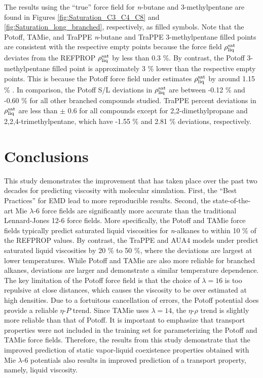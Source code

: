\documentclass[preprint,review,12pt]{elsarticle}
\begin{document}
	The results using the ``true'' force field for \textit{n}-butane and 3-methylpentane are found in Figures \ref{fig:Saturation_C3_C4_C8} and \ref{fig:Saturation_long_branched}, respectively, as filled symbols. Note that the Potoff, TAMie, and TraPPE \textit{n}-butane and TraPPE 3-methylpentane filled points are consistent with the respective empty points because the force field $\rho_{\rm liq}^{\rm sat}$ deviates from the REFPROP $\rho_{\rm liq}^{\rm sat}$ by less than 0.3 \%. By contrast, the Potoff 3-methylpentane filled point is approximately 3 \% lower than the respective empty points. This is because the Potoff force field under estimates $\rho_{\rm liq}^{\rm sat}$ by around 1.15 \% \cite{Potoff_branched}. In comparison, the Potoff S/L deviations in $\rho_{\rm liq}^{\rm sat}$ are between -0.12 \% and -0.60 \% for all other branched compounds studied. TraPPE percent deviations in $\rho_{\rm liq}^{\rm sat}$ are less than $\pm$ 0.6 for all compounds except for 2,2-dimethylpropane and 2,2,4-trimethylpentane, which have -1.55 \% and 2.81 \% deviations, respectively.     
	
	
	\section{Conclusions} \label{Conclusions}
	
	This study demonstrates the improvement that has taken place over the past two decades for predicting viscosity with molecular simulation. First, the ``Best Practices'' for EMD lead to more reproducible results. Second, the state-of-the-art Mie $\lambda$-6 force fields are significantly more accurate than the traditional Lennard-Jones 12-6 force fields. More specifically, the Potoff and TAMie force fields typically predict saturated liquid viscosities for \textit{n}-alkanes to within 10 \% of the REFPROP values. By contrast, the TraPPE and AUA4 models under predict saturated liquid viscosities by 20 \% to 50 \%, where the deviations are largest at lower temperatures. While Potoff and TAMie are also more reliable for branched alkanes, deviations are larger and demonstrate a similar temperature dependence. The key limitation of the Potoff force field is that the choice of $\lambda = 16$ is too repulsive at close distances, which causes the viscosity to be over estimated at high densities. Due to a fortuitous cancellation of errors, the Potoff potential does provide a reliable $\eta$-$P$ trend. Since TAMie uses $\lambda =14$, the $\eta$-$\rho$ trend is slightly more reliable than that of Potoff. It is important to emphasize that transport properties were not included in the training set for parameterizing the Potoff and TAMie force fields. Therefore, the results from this study demonstrate that the improved prediction of static vapor-liquid coexistence properties obtained with Mie $\lambda$-6 potentials also results in improved prediction of a transport property, namely, liquid viscosity.
	
\end{document}

